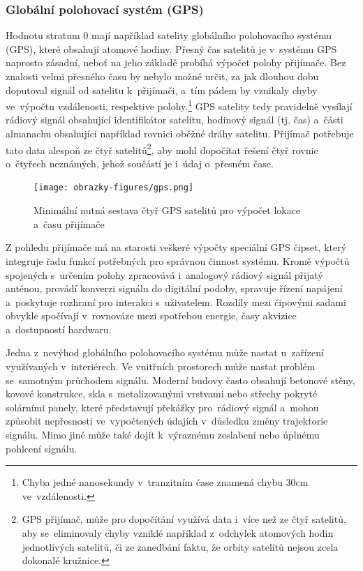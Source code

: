 \subsubsection{Globální polohovací systém (GPS)}
Hodnotu stratum 0 mají například satelity globálního polohovacího systému (GPS), které obsahují atomové hodiny. Přesný čas satelitů je v~systému GPS naprosto zásadní, neboť na jeho základě probíhá výpočet polohy přijímače. Bez znalosti velmi přesného času by nebylo možné určit, za jak dlouhou dobu doputoval signál od satelitu k~přijímači, a~tím pádem by vznikaly chyby ve~výpočtu vzdálenosti, respektive polohy.\footnote{Chyba jedné nanosekundy v~tranzitním čase znamená chybu 30cm ve~vzdálenosti.} GPS satelity tedy pravidelně vysílají rádiový signál obsahující identifikátor satelitu, hodinový signál (tj. čas) a~části almanachu obsahující například rovnici oběžné dráhy satelitu. Přijímač potřebuje tato data alespoň ze čtyř satelitů\footnote{GPS přijímač, může pro dopočítání využívá data i~více než ze čtyř satelitů, aby se~eliminovaly chyby vzniklé například z~odchylek atomových hodin jednotlivých satelitů, či ze zanedbání faktu, že orbity satelitů nejsou zcela dokonalé kružnice.}, aby mohl dopočítat řešení čtyř rovnic o~čtyřech neznámých, jehož součástí je i~údaj o~přesném čase.~\cite{sparkfun_gps}

\begin{figure}[h]
    \centering
    \texttt{[image: obrazky-figures/gps.png]}
    
    \caption{Minimální nutná sestava čtyř GPS satelitů pro výpočet lokace a~času přijímače~\cite{time_theory_gps}}
    \label{fig:low-power-modes}
\end{figure}

Z pohledu přijímače má na starosti veškeré výpočty speciální GPS čipset, který integruje řadu funkcí potřebných pro správnou činnost systému. Kromě výpočtů spojených s~určením polohy zpracovává i~analogový rádiový signál přijatý anténou, provádí konverzi signálu do digitální podoby, spravuje řízení napájení a~poskytuje rozhraní pro interakci s~uživatelem. Rozdíly mezi čipovými sadami obvykle spočívají v~rovnováze mezi spotřebou energie, časy akvizice a~dostupností hardwaru.~\cite{sparkfun_gps}

Jedna z~nevýhod globálního polohovacího systému může nastat u~zařízení využívaných v~interiérech. Ve vnitřních prostorech může nastat problém se~samotným průchodem signálu. Moderní budovy často obsahují betonové stěny, kovové konstrukce, skla s~metalizovanými vrstvami nebo střechy pokryté solárními panely, které představují překážky pro~rádiový signál a~mohou způsobit nepřesnosti ve~vypočtených údajích v~důsledku změny trajektorie signálu. Mimo jiné může také dojít k~výraznému zeslabení nebo úplnému pohlcení signálu.~\cite{sparkfun_gps}


